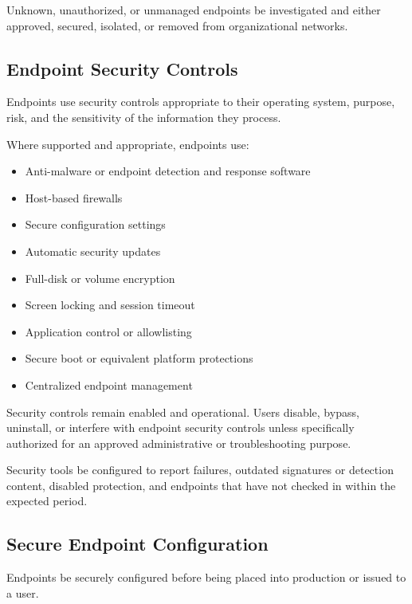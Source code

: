 Unknown, unauthorized, or unmanaged endpoints \must{} be investigated and either approved, secured, isolated, or removed from organizational networks.

\subsection{Endpoint Security Controls}

Endpoints \must{} use security controls appropriate to their operating system, purpose, risk, and the sensitivity of the information they process.

Where supported and appropriate, endpoints \must{} use:
\begin{itemize}
    \item Anti-malware or endpoint detection and response software
    \item Host-based firewalls
    \item Secure configuration settings
    \item Automatic security updates
    \item Full-disk or volume encryption
    \item Screen locking and session timeout
    \item Application control or allowlisting
    \item Secure boot or equivalent platform protections
    \item Centralized endpoint management
\end{itemize}

Security controls \must{} remain enabled and operational. Users \mustnot{} disable, bypass, uninstall, or interfere with endpoint security controls unless specifically authorized for an approved administrative or troubleshooting purpose.

Security tools \must{} be configured to report failures, outdated signatures or detection content, disabled protection, and endpoints that have not checked in within the expected period.

\subsection{Secure Endpoint Configuration}

Endpoints \must{} be securely configured before being placed into production or issued to a user.

